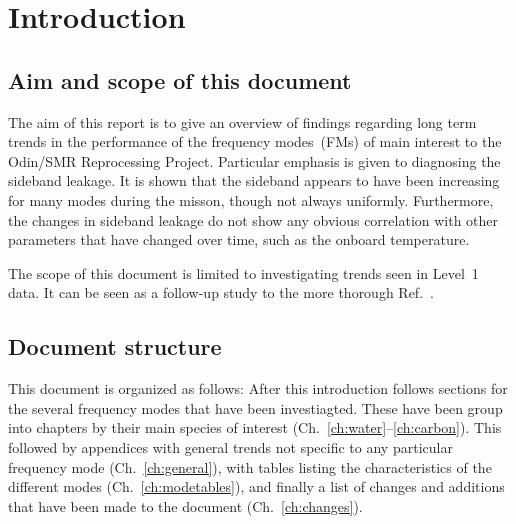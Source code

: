 \chapter{Introduction}
\label{ch:introduction}


\setcounter{page}{1}


\section{Aim and scope of this document}
\label{sec:aim}
The aim of this report is to give an overview of findings regarding long term
trends in the performance of the frequency modes~(FMs) of main interest to the
Odin/SMR Reprocessing Project.  Particular emphasis is given to diagnosing the
sideband leakage.  It is shown that the sideband appears to have been
increasing for many modes during the misson, though not always uniformly.
Furthermore, the changes in sideband leakage do not show any obvious
correlation with other parameters that have changed over time, such as the
onboard temperature.

The scope of this document is limited to investigating trends seen in Level~1
data. It can be seen as a follow-up study to the more thorough
Ref.~\cite{postlaunch:2006}.

\section{Document structure}
\label{sec:structure}
This document is organized as follows:  After this introduction follows
sections for the several frequency modes that have been investiagted.  These
have been group into chapters by their main species of interest
(Ch.~\ref{ch:water}--\ref{ch:carbon}).  This followed by appendices with general
trends not specific to any particular frequency mode (Ch.~\ref{ch:general}),
with tables listing the characteristics of the different modes
(Ch.~\ref{ch:modetables}), and finally a list of changes and additions that
have been made to the document (Ch.~\ref{ch:changes}).

